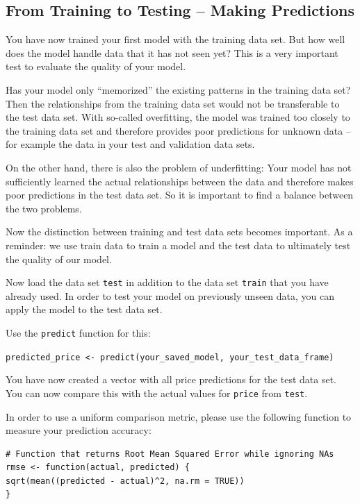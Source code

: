 \documentclass[
  11pt,
]{article}
\newenvironment{tips}[1]
  {
  \begin{itemize}
  \footnotesize
  \renewcommand{\labelitemi}{
    \raisebox{-.7\height}[0pt][0pt]{
      {\setkeys{Gin}{width=3em,keepaspectratio}
        \texttt{[image: images/\#1.png]}}
    }
  }
  \setlength{\fboxsep}{1em}
  \begin{rbox}
  \item
  }
  {
  \end{rbox}
  \end{itemize}
  }
\begin{document}
\hypertarget{from-training-to-testing-making-predictions}{%
\subsection{From Training to Testing -- Making Predictions}\label{from-training-to-testing-making-predictions}}

You have now trained your first model with the training data set. But how well does the model handle data that it has not seen yet? This is a very important test to evaluate the quality of your model.

Has your model only ``memorized'' the existing patterns in the training data set?
Then the relationships from the training data set would not be transferable to the test data set. With so-called overfitting, the model was trained too closely to the training data set and therefore provides poor predictions for unknown data -- for example the data in your test and validation data sets.

On the other hand, there is also the problem of underfitting: Your model has not sufficiently learned the actual relationships between the data and therefore makes poor predictions in the test data set. So it is important to find a balance between the two problems.

Now the distinction between training and test data sets becomes important. As a reminder: we use train data to train a model and the test data to ultimately test the quality of our model.

Now load the data set \texttt{test} in addition to the data set \texttt{train} that you have already used. In order to test your model on previously unseen data, you can apply the model to the test data set.

\begin{tips}r

Use the \texttt{predict} function for this:

\texttt{predicted\_price\ \textless{}-\ predict(your\_saved\_model,\ your\_test\_data\_frame)}

You have now created a vector with all price predictions for the test data set. You can now compare this with the actual values for \texttt{price} from \texttt{test}.

In order to use a uniform comparison metric, please use the following function to measure your prediction accuracy:

\begin{verbatim}
# Function that returns Root Mean Squared Error while ignoring NAs
rmse <- function(actual, predicted) {
sqrt(mean((predicted - actual)^2, na.rm = TRUE))
}
\end{verbatim}


\end{tips}
\end{document}
